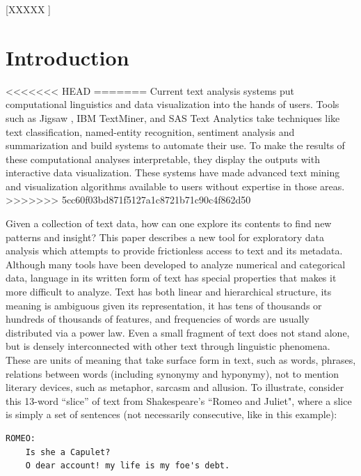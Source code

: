 \documentclass{sig-alternate}
\begin{document}

[XXXXX ]


\section{Introduction}
<<<<<<< HEAD
=======
Current text analysis systems put computational linguistics and data visualization into the hands of users. Tools such as Jigsaw \cite{gorg_combining_2012}, IBM TextMiner, and SAS Text Analytics take techniques like text classification, named-entity recognition, sentiment analysis and summarization and build systems to automate their use. To make the results of these computational analyses interpretable, they display the outputs with interactive data visualization. These systems have made advanced text mining and visualization algorithms available to users without expertise in those areas.
>>>>>>> 5cc60f03bd871f5127a1c8721b71c90c4f862d50

Given a collection of text data, how can one explore its contents to find new patterns and insight?  This paper describes a new tool for exploratory data analysis \cite{tukey} which attempts to provide frictionless access to text and its metadata.  Although many tools have been developed to analyze numerical and categorical data, language in its written form of text has special properties that makes it more difficult to analyze. Text has both linear and hierarchical structure, its meaning is ambiguous given its representation, it has tens of thousands or hundreds of thousands of features, and frequencies of words are usually distributed via a power law.   Even a small fragment of text does not stand alone, but is densely interconnected with other text through linguistic phenomena.  These are units of meaning that take surface form in text, such as words, phrases, relations between words (including synonymy and hyponymy), not to mention literary devices, such as metaphor, sarcasm and allusion. To illustrate, consider this 13-word ``slice'' of text from Shakespeare's ``Romeo and Juliet", where a slice is simply a set of sentences (not necessarily consecutive, like in this example):

\begin{verbatim}
ROMEO:
    Is she a Capulet?
    O dear account! my life is my foe's debt.
\end{verbatim}
\end{document}
